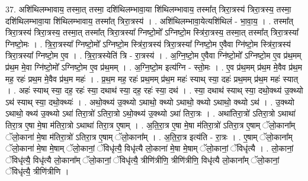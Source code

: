 \documentclass[17pt]{extarticle}
\begin{document}
37. अशि॑थिलम्भावाय॒ तस्मा॒त् तस्मा॒ दशि॑थिलम्भावा॒या शि॑थिलम्भावाय॒ तस्मा᳚त् त्रिरा॒त्रस्य॑ त्रिरा॒त्रस्य॒ तस्मा॒ दशि॑थिलम्भावा॒या शि॑थिलम्भावाय॒ तस्मा᳚त् त्रिरा॒त्रस्य॑ । . अशि॑थिलम्भावा॒येत्यशि॑थिलं - भा॒वा॒य॒ । . तस्मा᳚त् त्रिरा॒त्रस्य॑ त्रिरा॒त्रस्य॒ तस्मा॒त् तस्मा᳚त् त्रिरा॒त्रस्या᳚ ग्निष्टो॒मो᳚ ऽग्निष्टो॒म स्त्रि॑रा॒त्रस्य॒ तस्मा॒त् तस्मा᳚त् त्रिरा॒त्रस्या᳚ ग्निष्टो॒मः । . त्रि॒रा॒त्रस्या᳚ ग्निष्टो॒मो᳚ ऽग्निष्टो॒म स्त्रि॑रा॒त्रस्य॑ त्रिरा॒त्रस्या᳚ ग्निष्टो॒म ए॒वैवा ग्नि॑ष्टो॒म स्त्रि॑रा॒त्रस्य॑ त्रिरा॒त्रस्या᳚ ग्निष्टो॒म ए॒व । . त्रि॒रा॒त्रस्येति॑ त्रि - रा॒त्रस्य॑ । . अ॒ग्नि॒ष्टो॒म ए॒वैवा ग्नि॑ष्टो॒मो᳚ ऽग्निष्टो॒म ए॒व प्र॑थ॒मम् प्र॑थ॒म मे॒वा ग्नि॑ष्टो॒मो᳚ ऽग्निष्टो॒म ए॒व प्र॑थ॒मम् । . अ॒ग्नि॒ष्टो॒म इत्य॑ग्नि - स्तो॒मः । . ए॒व प्र॑थ॒मम् प्र॑थ॒म मे॒वैव प्र॑थ॒म मह॒ रहः॑ प्रथ॒म मे॒वैव प्र॑थ॒म महः॑ । . प्र॒थ॒म मह॒ रहः॑ प्रथ॒मम् प्र॑थ॒म महः॑ स्याथ् स्या॒ दहः॑ प्रथ॒मम् प्र॑थ॒म महः॑ स्यात् । . अहः॑ स्याथ् स्या॒ दह॒ रहः॑ स्या॒ दथाथ॑ स्या॒ दह॒ रहः॑ स्या॒ दथ॑ । . स्या॒ दथाथ॑ स्याथ् स्या॒ दथो॒क्थ्य॑ उ॒क्थ्यो ऽथ॑ स्याथ् स्या॒ दथो॒क्थ्यः॑ । . अथो॒क्थ्य॑ उ॒क्थ्यो ऽथाथो॒ क्थ्यो ऽथाथो॒ क्थ्यो ऽथाथो॒ क्थ्यो ऽथ॑ । . उ॒क्थ्यो ऽथाथो॒ क्थ्य॑ उ॒क्थ्यो ऽथा॑ तिरा॒त्रो॑ ऽतिरा॒त्रो ऽथो॒क्थ्य॑ उ॒क्थ्यो ऽथा॑ तिरा॒त्रः । . अथा॑तिरा॒त्रो॑ ऽतिरा॒त्रो ऽथाथा॑ तिरा॒त्र ए॒षा मे॒षा म॑तिरा॒त्रो ऽथाथा॑ तिरा॒त्र ए॒षाम् । . अ॒ति॒रा॒त्र ए॒षा मे॒षा म॑तिरा॒त्रो॑ ऽतिरा॒त्र ए॒षाम् ॅलो॒काना᳚म् ॅलो॒काना॑ मे॒षा म॑तिरा॒त्रो॑ ऽतिरा॒त्र ए॒षाम् ॅलो॒काना᳚म् । . अ॒ति॒रा॒त्र इत्य॑ति - रा॒त्रः । . ए॒षाम् ॅलो॒काना᳚म् ॅलो॒काना॑ मे॒षा मे॒षाम् ॅलो॒कानां॒ ॅविधृ॑त्यै॒ विधृ॑त्यै लो॒काना॑ मे॒षा मे॒षाम् ॅलो॒कानां॒ ॅविधृ॑त्यै । . लो॒कानां॒ ॅविधृ॑त्यै॒ विधृ॑त्यै लो॒काना᳚म् ॅलो॒कानां॒ ॅविधृ॑त्यै॒ त्रीणि॑त्रीणि॒ त्रीणि॑त्रीणि॒ विधृ॑त्यै लो॒काना᳚म् ॅलो॒कानां॒ ॅविधृ॑त्यै॒ त्रीणि॑त्रीणि । \newline
\end{document}
